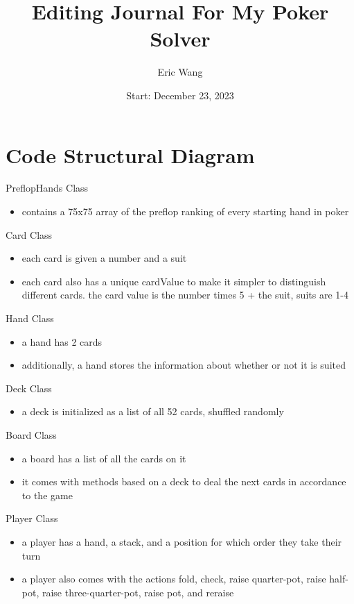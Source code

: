 \documentclass{article}
\title{Editing Journal For My Poker Solver}
\author{Eric Wang}
\date{Start: December 23, 2023}
\begin{document}
\maketitle
\newpage

\section{Code Structural Diagram} 

\noindent PreflopHands Class
\begin{itemize}
    \item contains a 75x75 array of the 
preflop ranking of every starting hand
in poker
\end{itemize}

\noindent Card Class
\begin{itemize}
    \item each card is given a number and
a suit
    \item each card also has a unique 
cardValue to make it simpler to distinguish
different cards. the card value is the number
times 5 + the suit, suits are 1-4
\end{itemize}

\noindent Hand Class
\begin{itemize}
    \item a hand has 2 cards
    \item additionally, a hand stores the
information about whether or not it is suited
\end{itemize}

\noindent Deck Class
\begin{itemize}
    \item a deck is initialized as a list of 
all 52 cards, shuffled randomly
\end{itemize}

\noindent Board Class
\begin{itemize}
    \item a board has a list of all the cards 
on it
    \item it comes with methods based on a 
deck to deal the next cards in accordance to
the game
\end{itemize}

\noindent Player Class
\begin{itemize}
    \item a player has a hand, a stack, and 
a position for which order they take their 
turn
    \item a player also comes with the actions
fold, check, raise quarter-pot, raise half-pot, 
raise three-quarter-pot, raise pot, and reraise
\end{itemize}
\end{document}
